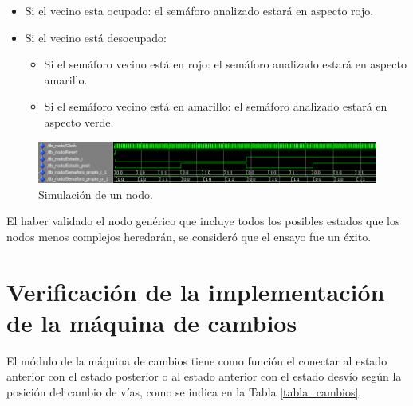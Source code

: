 			\begin{itemize}
				\item Si el vecino esta ocupado: el semáforo analizado estará en aspecto rojo.
				\item Si el vecino está desocupado:
				\begin{itemize}
					\item Si el semáforo vecino está en rojo: el semáforo analizado estará en aspecto amarillo.
					\item Si el semáforo vecino está en amarillo:  el semáforo analizado estará en aspecto verde.
				\end{itemize}				 
			\end{itemize}
			
			\begin{figure}[h]
			\centering
			\includegraphics[scale=0.6]{./Figures/Test/Nodo}
				\caption{Simulación de un nodo.}
				\label{fig:Test_Nodo}
			\end{figure}
				
			El haber validado el nodo genérico que incluye todos los posibles estados que los nodos menos complejos heredarán, se consideró que el ensayo fue un éxito.			
	
\section{Verificación de la implementación de la máquina de cambios}

	El módulo de la máquina de cambios tiene como función el conectar al estado anterior con el estado posterior o al estado anterior con el estado desvío según la posición del cambio de vías, como se indica en la Tabla \ref{tabla_cambios}.
	
